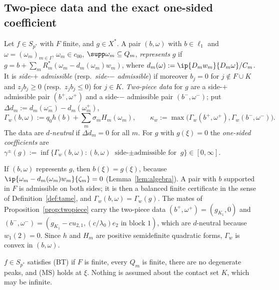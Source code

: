 
\subsection{Two-piece data and the exact one-sided coefficient}

\begin{definition}\label{def:twopiece}
Let $f\in S_{p^*}$ with $F$ finite, and $g\in X^*$.  A pair $(b,\omega)$
with $b\in\ell_1$ and $\omega=(\omega_m)_{m\in I}$, $\omega_m\in c_{00}$,
$\supp\omega_m\subseteq Q_m$, \emph{represents} $g$ if
$g=b+\sum_mR_m^*(\omega_m-d_m(\omega_m)w_m)$, where
$d_m(\omega):=\ip{D_mw_m}{D_m\omega}/C_m$.  It is \emph{side-$+$ admissible}
\textup{(}resp.\ \emph{side-$-$ admissible}\textup{)} if moreover $b_j=0$
for $j\notin F\cup K$ and $z_jb_j\ge0$ \textup{(}resp.\ $z_jb_j\le0$\textup{)}
for $j\in K$.  \emph{Two-piece data} for $g$ are a side-$+$ admissible pair
$(b^+,\omega^+)$ and a side-$-$ admissible pair $(b^-,\omega^-)$; put
$\Delta d_m:=d_m(\omega^-_m)-d_m(\omega^+_m)$,
\[
 \Gamma_w(b,\omega):=q_0h(b)+\sum_m\sigma_mH_m(\omega_m),\qquad
 \kappa_w:=\max\big(\Gamma_w(b^+,\omega^+),\Gamma_w(b^-,\omega^-)\big).
\]
The data are \emph{$d$-neutral} if $\Delta d_m=0$ for all $m$.  For $g$ with
$g(\xi)=0$ the \emph{one-sided coefficients} are
$\gamma^\pm(g):=\inf\{\Gamma_w(b,\omega):(b,\omega)\text{ side-$\pm$
admissible for }g\}\in[0,\infty]$.
\end{definition}

If $(b,\omega)$ represents $g$, then $b(\xi)=g(\xi)$, because
$\ip{\omega_m-d_m(\omega_m)w_m}{\zeta_m}=0$ (Lemma~\ref{lem:algebra}).  A
pair with $b$ supported in $F$ is admissible on both sides; it is then a
balanced finite certificate in the sense of Definition~\ref{def:tame}, and
$\Gamma_w(b,\omega)=\Gamma_w(g)$.  The mates of
Proposition~\ref{prop:twopiece} carry the two-piece data
$(b^+,\omega^+)=(g_{K_1},0)$ and $(b^-,\omega^-)=(g_{K_1}-cu_{2,1},
(c/\lambda_0)e_2\text{ in block }1)$, which are $d$-neutral because
$w_1(2)=0$.  Since $h$ and $H_m$ are positive semidefinite quadratic forms,
$\Gamma_w$ is convex in $(b,\omega)$.

\begin{definition}\label{def:BT}
$f\in S_{p^*}$ satisfies \textup{(BT)} if $F$ is finite, every $Q_m$ is
finite, there are no degenerate peaks, and \textup{(MS)} holds at $\xi$.
Nothing is assumed about the contact set $K$, which may be infinite.
\end{definition}


